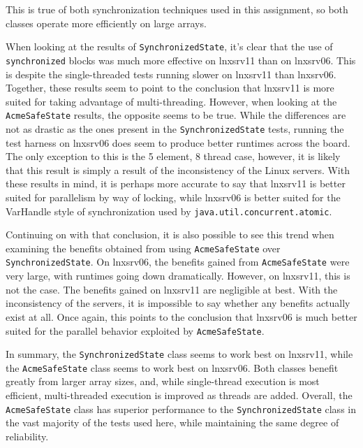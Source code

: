 This is true of both synchronization techniques used in this assignment, so both classes
operate more efficiently on large arrays.
\par When looking at the results of \texttt{SynchronizedState}, it's clear that
the use of \texttt{synchronized} blocks was much more effective on lnxsrv11 than
on lnxsrv06. This is despite the single-threaded tests running slower on lnxsrv11
than lnxsrv06. Together, these results seem to point to the conclusion that lnxsrv11
is more suited for taking advantage of multi-threading. However, when looking at
the \texttt{AcmeSafeState} results, the opposite seems to be true. While the differences
are not as drastic as the ones present in the \texttt{SynchronizedState} tests,
running the test harness on lnxsrv06 does seem to produce better runtimes across the
board. The only exception to this is the 5 element, 8 thread case, however, it is likely
that this result is simply a result of the inconsistency of the Linux servers. With
these results in mind, it is perhaps more accurate to say that lnxsrv11 is better suited
for parallelism by way of locking, while lnxsrv06 is better suited for the VarHandle style
of synchronization used by \texttt{java.util.concurrent.atomic}.
\par Continuing on with that conclusion, it is also possible to see this trend when
examining the benefits obtained from using \texttt{AcmeSafeState} over \texttt{SynchronizedState}.
On lnxsrv06, the benefits gained from \texttt{AcmeSafeState} were very large, with runtimes
going down dramatically. However, on lnxsrv11, this is not the case. The benefits gained on
lnxsrv11 are negligible at best. With the inconsistency of the servers, it is impossible
to say whether any benefits actually exist at all. Once again, this points to the
conclusion that lnxsrv06 is much better suited for the parallel behavior exploited by
\texttt{AcmeSafeState}.
\par In summary, the \texttt{SynchronizedState} class seems to work best on lnxsrv11, while the 
\texttt{AcmeSafeState} class seems to work best on lnxsrv06. Both classes benefit greatly from
larger array sizes, and, while single-thread execution is most efficient, multi-threaded
execution is improved as threads are added. Overall, the \texttt{AcmeSafeState} class has
superior performance to the \texttt{SynchronizedState} class in the vast majority of the
tests used here, while maintaining the same degree of reliability.

